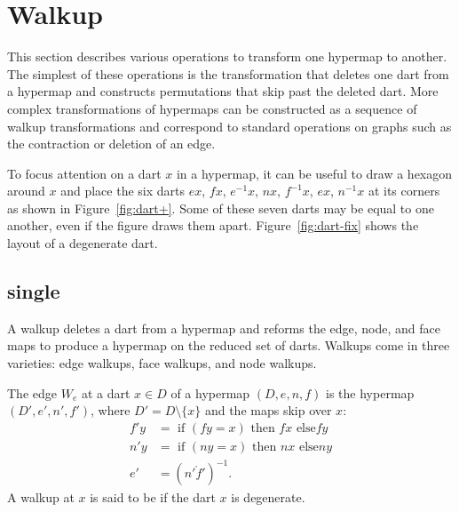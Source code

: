 \section{Walkup}

This section describes various operations to transform one hypermap to
another.  The simplest of these operations is the 
transformation that deletes one dart from a hypermap and constructs
permutations that skip past the deleted dart.  More complex
transformations of hypermaps can be constructed as a sequence of walkup
transformations and correspond to standard operations on graphs such as the
contraction or deletion of an edge.

To focus attention on a dart $x$ in a hypermap, it can be useful to draw a
hexagon around $x$ and place the six darts $e x$, $f x$, $e^{-1} x$,
$n x$, $f^{-1} x$, $e x$, $n^{-1} x$ at its corners as shown in
Figure~\ref{fig:dart+}.  Some of these seven darts may be equal to one
another, even if the figure draws them apart.
Figure~\ref{fig:dart-fix} shows the layout of a degenerate dart.
%

\figLMGQYKG %

\figANDKKER %


\subsection{single}

A walkup deletes a dart from a hypermap and reforms the edge, node,
and face maps to produce a hypermap on the reduced set of darts.
Walkups come in three varieties: edge walkups, face walkups, and node
walkups.

\begin{definition}
The edge 
$W_e$ at  a dart $x\in D$ of a hypermap $(D,e,n,f)$ is the hypermap
$(D',e',n',f')$, where $D' = D\setminus\{x\}$ and the maps skip over $x$:
\begin{align*}
f' y &= \text{ if } (f y =  x) \text{ then } f x \text{ else
} f y\\
n' y &= \text{ if } (n y = x) \text{ then } n x \text{ else
} n y\\
e' &= (n'\ocirc f')^{-1}.
\end{align*}
A walkup at $x$ is said to be  if the dart $x$ is
degenerate.  
%
%
%
%
%
\end{definition}

